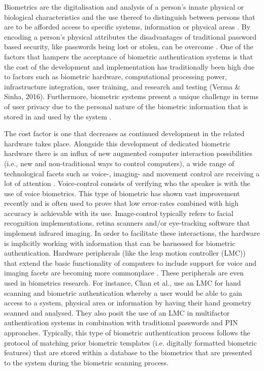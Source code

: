 Biometrics are the digitalisation and analysis of a person’s innate physical or biological characteristics and the use thereof to distinguish between persons that are to be afforded access to specific systems, information or physical areas \cite{Rathgeb2011}. By encoding a person’s physical attributes the disadvantages of traditional password based security, like passwords being lost or stolen, can be overcome \cite{Verma2016}. One of the factors that hampers the acceptance of biometric authentication systems is that the cost of the development and implementation has traditionally been high due to factors such as biometric hardware, computational processing power, infrastructure integration, user training, and research and testing (Verma \& Sinha, 2016). Furthermore, biometric systems present a unique challenge in terms of user privacy due to the personal nature of the biometric information that is stored in and used by the system \cite{Paul2012}.

The cost factor is one that decreases as continued development in the related hardware takes place. Alongside this development of dedicated biometric hardware there is an influx of new augmented computer interaction possibilities (i.e., new and non-traditional ways to control computers), a wide range of technological facets such as voice-, imaging- and movement control are receiving a lot of attention \cite{Paul2012, Verma2016}. Voice-control consists of verifying who the speaker is with the use of voice biometrics. This type of biometric has shown vast improvement recently and is often used to prove that low error-rates combined with high accuracy is achievable with its use. Image-control typically refers to facial recognition implementations, retina scanners and/or eye-tracking software that implement infrared imaging. In order to facilitate these interactions, the hardware is implicitly working with information that can be harnessed for biometric authentication. Hardware peripherals (like the leap motion controller (LMC)) that extend the basic functionality of computers to include support for voice and imaging facets are becoming more commonplace \cite{Rathgeb2011}. These peripherals are even used in biometrics research. For instance, Chan et al.\cite{Chan2015}, use an LMC for hand scanning and biometric authentication whereby a user would be able to gain access to a system, physical area or information by having their hand geometry scanned and analysed. They also posit the use of an LMC in multifactor authentication systems in combination with traditional passwords and PIN approaches. 
Typically, this type of biometric authentication process follows the protocol of matching prior biometric templates (i.e. digitally formatted biometric features) that are stored within a database to the biometrics that are presented to the system during the biometric scanning process. 

